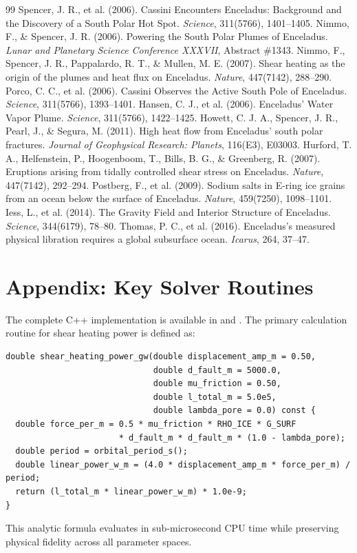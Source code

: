 \documentclass[11pt,a4paper]{article}
\begin{document}
\begin{thebibliography}{99}
 Spencer, J. R., et al. (2006). Cassini Encounters Enceladus: Background and the Discovery of a South Polar Hot Spot. \textit{Science}, 311(5766), 1401--1405.
 Nimmo, F., \& Spencer, J. R. (2006). Powering the South Polar Plumes of Enceladus. \textit{Lunar and Planetary Science Conference XXXVII}, Abstract \#1343.
 Nimmo, F., Spencer, J. R., Pappalardo, R. T., \& Mullen, M. E. (2007). Shear heating as the origin of the plumes and heat flux on Enceladus. \textit{Nature}, 447(7142), 288--290.
 Porco, C. C., et al. (2006). Cassini Observes the Active South Pole of Enceladus. \textit{Science}, 311(5766), 1393--1401.
 Hansen, C. J., et al. (2006). Enceladus' Water Vapor Plume. \textit{Science}, 311(5766), 1422--1425.
 Howett, C. J. A., Spencer, J. R., Pearl, J., \& Segura, M. (2011). High heat flow from Enceladus' south polar fractures. \textit{Journal of Geophysical Research: Planets}, 116(E3), E03003.
 Hurford, T. A., Helfenstein, P., Hoogenboom, T., Bills, B. G., \& Greenberg, R. (2007). Eruptions arising from tidally controlled shear stress on Enceladus. \textit{Nature}, 447(7142), 292--294.
 Postberg, F., et al. (2009). Sodium salts in E-ring ice grains from an ocean below the surface of Enceladus. \textit{Nature}, 459(7250), 1098--1101.
 Iess, L., et al. (2014). The Gravity Field and Interior Structure of Enceladus. \textit{Science}, 344(6179), 78--80.
 Thomas, P. C., et al. (2016). Enceladus's measured physical libration requires a global subsurface ocean. \textit{Icarus}, 264, 37--47.
\end{thebibliography}

\appendix
\section{Appendix: Key Solver Routines}
The complete C++ implementation is available in  and . The primary calculation routine for shear heating power is defined as:
\begin{verbatim}
double shear_heating_power_gw(double displacement_amp_m = 0.50,
                              double d_fault_m = 5000.0,
                              double mu_friction = 0.50,
                              double l_total_m = 5.0e5,
                              double lambda_pore = 0.0) const {
  double force_per_m = 0.5 * mu_friction * RHO_ICE * G_SURF 
                       * d_fault_m * d_fault_m * (1.0 - lambda_pore);
  double period = orbital_period_s();
  double linear_power_w_m = (4.0 * displacement_amp_m * force_per_m) / period;
  return (l_total_m * linear_power_w_m) * 1.0e-9;
}
\end{verbatim}
This analytic formula evaluates in sub-microsecond CPU time while preserving physical fidelity across all parameter spaces.
\end{document}
